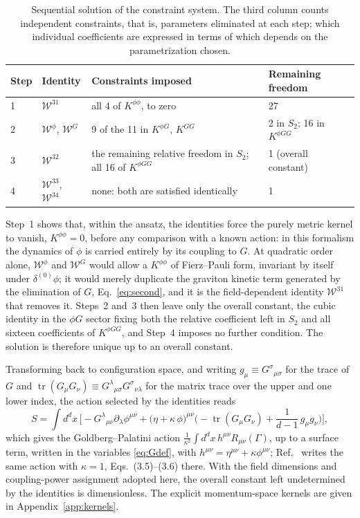 \documentclass[prd,aps,preprint,nofootinbib,amsmath,amssymb,eqsecnum]{revtex4-2}
\newcommand{\W}{\mathcal{W}}
\begin{document}
\begin{table}[htb]
\centering
\setlength{\tabcolsep}{10pt}
\begin{tabular}{@{}llp{5.2cm}l@{}}
\toprule
Step & Identity & \raggedright Constraints imposed & Remaining freedom \\
\midrule
1 & $\W^{31}$ & \raggedright all 4 of $K^{\phi\phi}$, to zero & 27 \\
2 & $\W^{\phi}$, $\W^{G}$ & \raggedright 9 of the 11 in $K^{\phi G}$, $K^{GG}$ & 2 in $S_2$; 16 in $K^{\phi GG}$ \\
3 & $\W^{32}$ & \raggedright the remaining relative freedom in $S_2$; all 16 of $K^{\phi GG}$ & 1 (overall constant) \\
4 & $\W^{33}$, $\W^{34}$ & \raggedright none: both are satisfied identically & 1 \\
\bottomrule
\end{tabular}
\caption{Sequential solution of the constraint system. The third column counts
independent constraints, that is, parameters eliminated at each step; which individual
coefficients are expressed in terms of which depends on the parametrization chosen.}
\label{tab:flow}
\end{table}

Step~1 shows that, within the ansatz, the identities force the purely metric kernel to vanish,
$K^{\phi\phi}=0$, before any comparison with a known action: in this formalism the
dynamics of $\phi$ is carried entirely by its coupling to $G$. At quadratic order alone, $\W^{\phi}$ and $\W^{G}$ would allow a $K^{\phi\phi}$ of
Fierz--Pauli form, invariant by itself under $\delta^{(0)}\phi$; it would merely duplicate the
graviton kinetic term generated by the elimination of $G$, Eq.~\eqref{eq:second}, and it is the field-dependent identity $\W^{31}$
that removes it. Steps~2 and~3 then leave only
the overall constant, the cubic identity in the $\phi G$ sector fixing both the relative
coefficient left in $S_2$ and all sixteen coefficients of $K^{\phi GG}$, and Step~4 imposes
no further condition. The solution is therefore unique up to an overall constant.

Transforming back to configuration space, and writing $g_\mu\equiv G^{\sigma}{}_{\mu\sigma}$ for
the trace of $G$ and $\operatorname{tr}(G_\mu G_\nu)\equiv G^{\lambda}{}_{\mu\sigma}G^{\sigma}{}_{\nu\lambda}$
for the matrix trace over the upper and one lower index, the action selected by the identities reads
\begin{equation}
S=\int d^dx\,\Big[-G^{\lambda}{}_{\mu\nu}\partial_\lambda\phi^{\mu\nu}
+\big(\eta+\kappa\,\phi\big)^{\mu\nu}
\Big(-\operatorname{tr}(G_\mu G_\nu)+\frac{1}{d-1}\,g_\mu g_\nu\Big)\Big],
\label{eq:result}
\end{equation}
which gives the Goldberg--Palatini action
$\frac{1}{\kappa^2}\int d^dx\,h^{\mu\nu}R_{\mu\nu}(\Gamma)$, up to a surface term, written in the variables
\eqref{eq:Gdef}, with $h^{\mu\nu}=\eta^{\mu\nu}+\kappa\phi^{\mu\nu}$; Ref.~\cite{BrandtMcKeon2016}
writes the same action with $\kappa=1$, Eqs.~(3.5)--(3.6) there. With the field dimensions
and coupling-power assignment adopted here, the overall constant left undetermined by the
identities is dimensionless.
The explicit momentum-space kernels are given in Appendix~\ref{app:kernels}.
\end{document}
